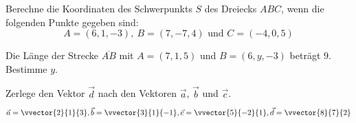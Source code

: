 \documentclass[12pt]{exam}
\begin{document}
\begin{questions}
\question[4]
\vspace{5pt}
\vspace{5pt}


\newpage
\question[4]
Berechne die Koordinaten des Schwerpunkts $S$ des Dreiecks $ABC$, wenn die folgenden Punkte gegeben sind:
\[A=(6,1,-3),\:B=(7,-7,4) \text{ und } C=(-4,0,5)\] 
\vspace{5pt}

\newpage
\question[4]
Die Länge der Strecke $\overline{AB}$ mit $A=(7,1,5)$ und $B=(6,y,-3)$ beträgt $9$. Bestimme $y$.
\vspace{5pt}

\newpage
\question[6]
Zerlege den Vektor $\vec{d}$ nach den Vektoren $\vec{a}$, $\vec{b}$ und $\vec{c}$. \[ \vec{a} = \vvector{2}{1}{3}, \vec{b} = \vvector{3}{1}{-1}, \vec{c} = \vvector{5}{-2}{1}, \vec{d} = \vvector{8}{7}{2} \]
\vspace{5pt}

\newpage
\question[3]
\vspace{5pt}
\begin{parts}
\setcounter{partno}{1}

\end{parts}
\end{questions}
\end{document}
